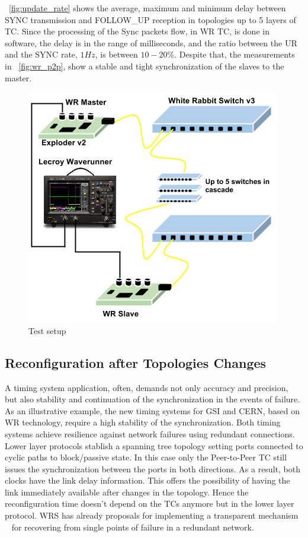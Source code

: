 \figurename~\ref{fig:update_rate} shows the average, maximum and minimum delay between SYNC
transmission and FOLLOW\_UP reception in topologies up to 5 layers of TC. Since
the processing of the Sync packets flow, in WR TC, is done in software, the
delay is in the range of milliseconds, and the ratio between the UR and the
SYNC rate, $1 Hz$, is between $10-20\%$. Despite that, the measurements in
\figurename~\ref{fig:wr_p2p}, show a stable and tight synchronization of the
slaves to the master.

\FloatBarrier
\begin{figure}[!t]
\centering
\includegraphics[scale=0.50]{fig/tc_test_bed.png}
\caption{Test setup}
\label{fig:test_setup}
\end{figure}


\subsection{Reconfiguration after Topologies Changes}

A timing system application, often, demands not only accuracy and precision, 
but also stability and continuation of the synchronization in the events
of failure. As an illustrative example, the new timing systems for GSI and CERN,
based on WR technology, require a high stability of the synchronization. 
Both timing systems achieve resilience against 
network failures using redundant connections.  Lower layer protocols stablish a
spanning tree topology setting ports connected to cyclic paths to block/passive
state. In this case only the Peer-to-Peer TC still issues the synchronization between the
ports in both directions. As a result, both clocks have the link delay
information. This offers the possibility of having the link immediately available after 
changes in the topology. Hence the reconfiguration time doesn't depend on the TCs anymore 
but in the lower layer protocol. WRS has already
proposals for implementing a transparent mechanism ~\cite{biblio:wrswitch} for
recovering from single points of failure in a redundant network.

